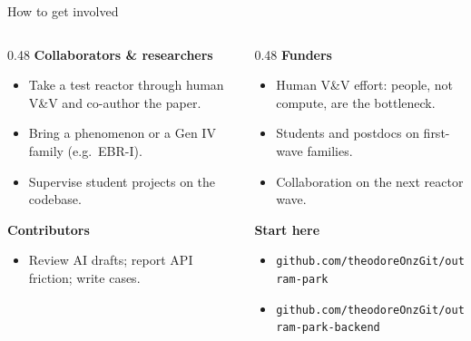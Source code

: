 \documentclass[aspectratio=169]{beamer}
\begin{document}
\begin{frame}{How to get involved}
    \begin{columns}[T]
        \begin{column}{0.48\textwidth}
            \textbf{Collaborators \& researchers}
            \begin{itemize}
                \footnotesize
                \item Take a test reactor through human V\&V and co-author
                      the paper.
                \item Bring a phenomenon or a Gen IV family (e.g.\ EBR-I).
                \item Supervise student projects on the codebase.
            \end{itemize}

            \medskip
            \textbf{Contributors}
            \begin{itemize}
                \footnotesize
                \item Review AI drafts; report API friction; write cases.
            \end{itemize}
        \end{column}
        \begin{column}{0.48\textwidth}
            \textbf{Funders}
            \begin{itemize}
                \footnotesize
                \item Human V\&V effort: people, not compute, are the
                      bottleneck.
                \item Students and postdocs on first-wave families.
                \item Collaboration on the next reactor wave.
            \end{itemize}

            \medskip
            \textbf{Start here}
            \begin{itemize}
                \footnotesize
                \item \texttt{github.com/theodoreOnzGit/outram-park}
                \item \texttt{github.com/theodoreOnzGit/outram-park-backend}
            \end{itemize}
        \end{column}
    \end{columns}
\end{frame}


\end{document}
